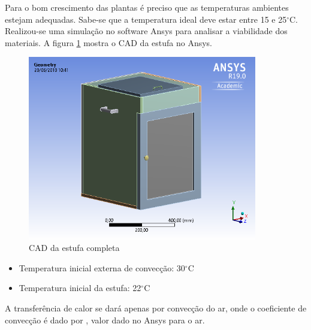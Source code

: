 Para o bom crescimento das plantas é preciso que as temperaturas ambientes estejam adequadas. Sabe-se que a temperatura ideal deve estar entre 15 e 25$^{\circ}$C. Realizou-se uma simulação no software Ansys para analisar a viabilidade dos materiais. A figura \ref{fig:CAD_estufa} mostra o CAD da estufa no Ansys.
\begin{figure}[H]
	\centering
	\includegraphics[width=10cm]{figuras/CAD_estufa.png}
	\caption{CAD da estufa completa}
	\label{fig:CAD_estufa}
\end{figure}

\begin{itemize}
	\item Temperatura inicial externa de convecção: 30$^{\circ}$C
	\item Temperatura inicial da estufa: 22$^{\circ}$C
\end{itemize}
A transferência de calor se dará apenas por convecção do ar, onde o coeficiente de convecção é dado por , valor dado no Ansys para o ar.

